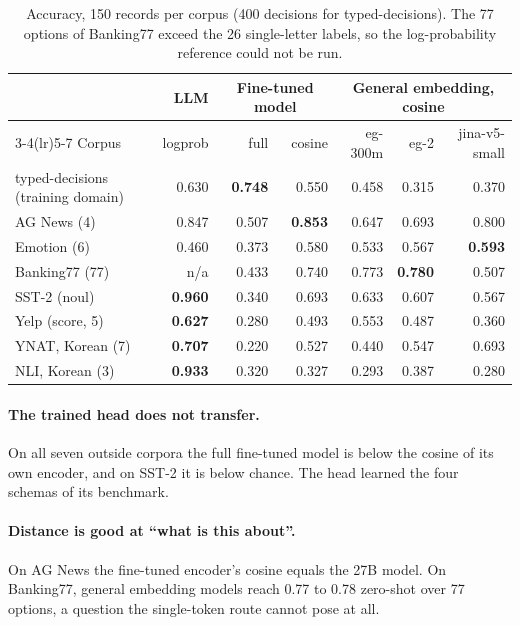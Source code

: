 \documentclass[11pt]{article}
\begin{document}
\begin{table}[h]\centering
\begin{tabular}{lrrrrrr}
\toprule
 & LLM & \multicolumn{2}{c}{Fine-tuned model} & \multicolumn{3}{c}{General embedding, cosine} \\
\cmidrule(lr){3-4}\cmidrule(lr){5-7}
Corpus & logprob & full & cosine & eg-300m & eg-2 & jina-v5-small \\
\midrule
typed-decisions (training domain) & 0.630 & \textbf{0.748} & 0.550 & 0.458 & 0.315 & 0.370 \\
\midrule
AG News (4) & 0.847 & 0.507 & \textbf{0.853} & 0.647 & 0.693 & 0.800 \\
Emotion (6) & 0.460 & 0.373 & 0.580 & 0.533 & 0.567 & \textbf{0.593} \\
Banking77 (77) & n/a & 0.433 & 0.740 & 0.773 & \textbf{0.780} & 0.507 \\
SST-2 (noul) & \textbf{0.960} & 0.340 & 0.693 & 0.633 & 0.607 & 0.567 \\
Yelp (score, 5) & \textbf{0.627} & 0.280 & 0.493 & 0.553 & 0.487 & 0.360 \\
YNAT, Korean (7) & \textbf{0.707} & 0.220 & 0.527 & 0.440 & 0.547 & 0.693 \\
NLI, Korean (3) & \textbf{0.933} & 0.320 & 0.327 & 0.293 & 0.387 & 0.280 \\
\bottomrule
\end{tabular}
\caption{Accuracy, 150 records per corpus (400 decisions for
typed-decisions). The 77 options of Banking77 exceed the 26 single-letter
labels, so the log-probability reference could not be run.}
\label{tab:ood}
\end{table}

\paragraph{The trained head does not transfer.} On all seven outside corpora
the full fine-tuned model is below the cosine of its own encoder, and on SST-2
it is below chance. The head learned the four schemas of its benchmark.

\paragraph{Distance is good at ``what is this about''.} On AG News the
fine-tuned encoder's cosine equals the 27B model. On Banking77, general
embedding models reach 0.77 to 0.78 zero-shot over 77 options, a question the
single-token route cannot pose at all.
\end{document}
